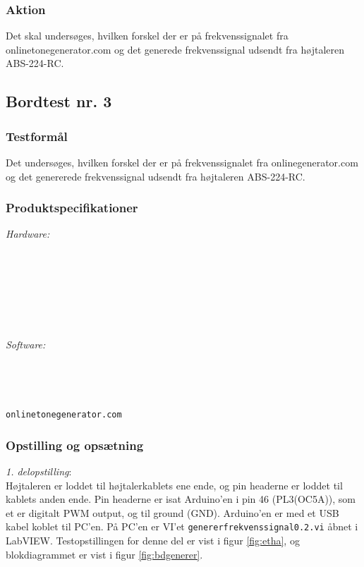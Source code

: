 			\subsubsection{Aktion}
			Det skal undersøges, hvilken forskel der er på frekvenssignalet fra onlinetonegenerator.com og det generede frekvenssignal udsendt fra højtaleren ABS-224-RC.  
	
		\subsection{Bordtest nr. 3} %
		\subsubsection{Testformål}
		Det undersøges, hvilken forskel der er på frekvenssignalet fra onlinegenerator.com og det genererede frekvenssignal udsendt fra højtaleren ABS-224-RC.  
		
		\subsubsection{Produktspecifikationer}
		
		\textit{Hardware:}\\
		\\
		\\
		\pins\\
		\krympeflex
		\arduino\\
		\usbkabel\\
		\PC\\
		\mikrofon\\
	
		\textit{Software:}\\
		\labview\\
		\visa\\
		\vi\\
		\ardsw\\
		\texttt{onlinetonegenerator.com}
		
		\subsubsection{Opstilling og opsætning}
		\textit{1. delopstilling}:\\
		Højtaleren er loddet til højtalerkablets ene ende, og pin headerne er loddet til kablets anden ende. 
		Pin headerne er isat Arduino'en i pin 46 (PL3(OC5A)), som et er digitalt PWM output, og til ground (GND). 
		Arduino'en er med et USB kabel koblet til PC'en. 		
		På PC'en er VI'et \texttt{genererfrekvenssignal0.2.vi} åbnet i LabVIEW. Testopstillingen for denne del er vist i figur \ref{fig:etha}, og blokdiagrammet er vist i figur \ref{fig:bdgenerer}.\\ 
 
